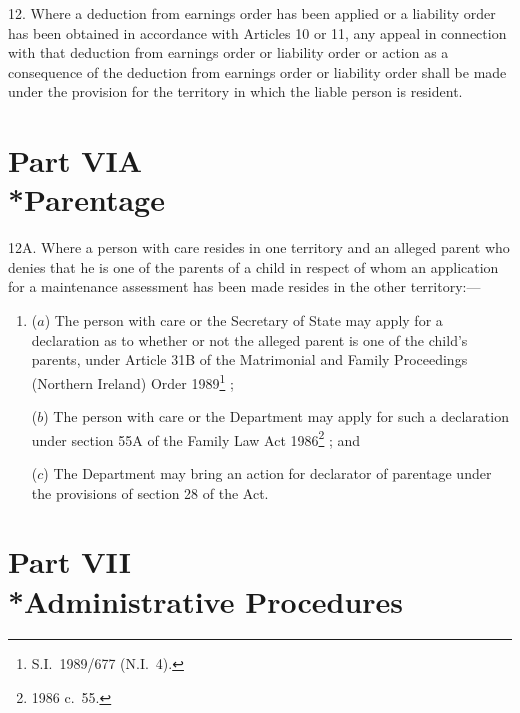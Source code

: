 \documentclass[12pt,a4paper]{article}
\begin{document}
\medskip

12.   Where a deduction from earnings order has been applied or a liability order has been obtained in accordance with Articles 10 or 11, any appeal in connection with that deduction from earnings order or liability order or action as a consequence of the deduction from earnings order or liability order shall be made under the provision for the territory in which the liable person is resident.

\section[Part VIA --- Parentage]{Part VIA\\*Parentage}

\renewcommand\parthead{--- Schedule 1 Part VIA}

12A.  Where a person with care resides in one territory and an alleged parent who denies that he is one of the parents of a child in respect of whom an application for a maintenance assessment has been made resides in the other territory:—
\begin{enumerate}\item[]
($a$) The person with care or the Secretary of State may apply for a declaration as to whether or not the alleged parent is one of the child’s parents, under
Article 31B of the Matrimonial and Family Proceedings (Northern Ireland) Order 1989\footnote{S.I.\ 1989/677 (N.I.\ 4).}%
;

($b$) The person with care or the Department 
may apply for such a declaration under 
section 55A of the Family Law Act 1986\footnote{1986 c.\ 55.}%
; and

($c$) The Department 
may bring an action for declarator of parentage under the provisions of section 28 of the Act.
\end{enumerate}


\section[Part VII --- Administrative Procedures]{Part VII\\*Administrative Procedures}
\end{document}
